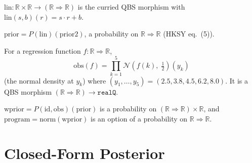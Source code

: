 \begin{definition}\label{def:lin}
  \rocqok
  $\mathrm{lin} : \mathbb{R} \times \mathbb{R} \to (\mathbb{R} \Rightarrow
  \mathbb{R})$ is the curried QBS morphism with
  $\mathrm{lin}(s, b)(r) = s \cdot r + b$.
\end{definition}

\begin{definition}\label{def:prior}
  \rocqok
  $\mathrm{prior} = P(\mathrm{lin})(\mathrm{prior2})$, a probability on
  $\mathbb{R} \Rightarrow \mathbb{R}$ (HKSY eq.~(5)).
\end{definition}

\begin{definition}\label{def:obs}
  \rocqok
  For a regression function $f : \mathbb{R} \Rightarrow \mathbb{R}$,
  \[
    \mathrm{obs}(f) = \prod_{k=1}^{5}
    \mathcal{N}(f(k),\; \tfrac{1}{2})(y_k)
  \]
  (the normal density at $y_k$) where
  $(y_1, \ldots, y_5) = (2.5, 3.8, 4.5, 6.2, 8.0)$. It is a QBS
  morphism $(\mathbb{R} \Rightarrow \mathbb{R}) \to \mathtt{realQ}$.
\end{definition}

\begin{definition}\label{def:program}
  \rocqok
  $\mathrm{wprior} = P(\mathrm{id}, \mathrm{obs})(\mathrm{prior})$ is a
  probability on $(\mathbb{R} \Rightarrow \mathbb{R}) \times
  \mathbb{R}$, and $\mathrm{program} = \mathrm{norm}(\mathrm{wprior})$
  is an option of a probability on $\mathbb{R} \Rightarrow \mathbb{R}$.
\end{definition}


\section{Closed-Form Posterior}\label{sec:posterior}

